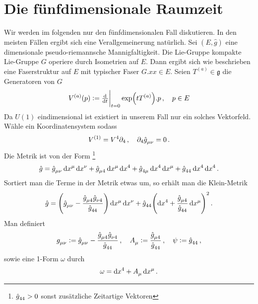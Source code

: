 \section{Die fünfdimensionale Raumzeit}
Wir werden im folgenden nur den fünfdimensionalen Fall diskutieren. In den
meisten Fällen ergibt sich eine Verallgemeinerung natürlich. Sei $(E,\hat{g})$
eine dimensionale pseudo-riemannsche Mannigfaltigkeit. Die Lie-Gruppe
kompakte Lie-Gruppe $G$ operiere durch Isometrien auf $E$. 
Dann ergibt sich wie beschrieben eine Faserstruktur auf $E$ mit typischer Faser
$G.x x\in E$. Seien $T^{(a)}\in \mathfrak{g}$ die Generatoren von $G$
\begin{equation}
V^{(a)}(p):=\od{}{t}\bigg|_{t=0}\exp\left(tT^{(a)}\right).p\,,\quad p\in E
\end{equation}
Da $U(1)$ eindimensional ist existiert in unserem Fall nur ein solches
Vektorfeld. Wähle ein Koordinatensystem sodass 
\begin{equation}
V^{(1)}=V^4\partial_4\,,\quad \partial_4\tensor{\hat{g}}{_\mu_\nu}=0\,.
\end{equation}
Die Metrik ist von der Form \footnote{$\tensor{\hat{g}}{_4_4}>0$ sonst
zusätzliche Zeitartige Vektoren}
\begin{equation}
\hat{g}=\tensor{\hat{g}}{_\mu_\nu}\dif\tensor{x}{^\mu}\dif\tensor{x}{^\nu}
+\tensor{\hat{g}}{_\mu_4}\dif\tensor{x}{^\mu}\dif\tensor{x}{^4}
+\tensor{\hat{g}}{_4_\mu}\dif\tensor{x}{^4}\dif\tensor{x}{^\mu}
+\tensor{\hat{g}}{_4_4}\dif\tensor{x}{^4}\dif\tensor{x}{^4}\,.
\end{equation}
Sortiert man die Terme in der Metrik etwas um, so erhält man die Klein-Metrik
\begin{equation}
\hat{g}=\left(\tensor{\hat{g}}{_\mu_\nu}-\frac{\tensor{\hat{g}}{_\mu_4}\tensor{\hat{g}}{_\nu_4}}{\tensor{\hat{g}}{_4_4}}\right)\dif\tensor{x}{^\mu}\dif\tensor{x}{^\nu}
+\tensor{\hat{g}}{_4_4}\left(\dif\tensor{x}{^4}+\frac{\tensor{\hat{g}}{_\mu_4}}{\tensor{\hat{g}}{_4_4}}\dif\tensor{x}{^\mu}\right)^2
\,.
\end{equation}
Man definiert 
\begin{equation}
\tensor{g}{_\mu_\nu}:=\tensor{\hat{g}}{_\mu_\nu}-\frac{\tensor{\hat{g}}{_\mu_4}\tensor{\hat{g}}{_\nu_4}}{\tensor{\hat{g}}{_4_4}}
\,,\quad
\tensor{A}{_\mu}:=\frac{\tensor{\hat{g}}{_\mu_4}}{\tensor{\hat{g}}{_4_4}}
\,,\quad
\psi:=\tensor{\hat{g}}{_4_4}\,,
\end{equation}
sowie eine 1-Form $\omega$ durch
\begin{equation}
\omega=\dif\tensor{x}{^4}+\tensor{A}{_\mu}\dif\tensor{x}{^\mu}\,.
\end{equation}
